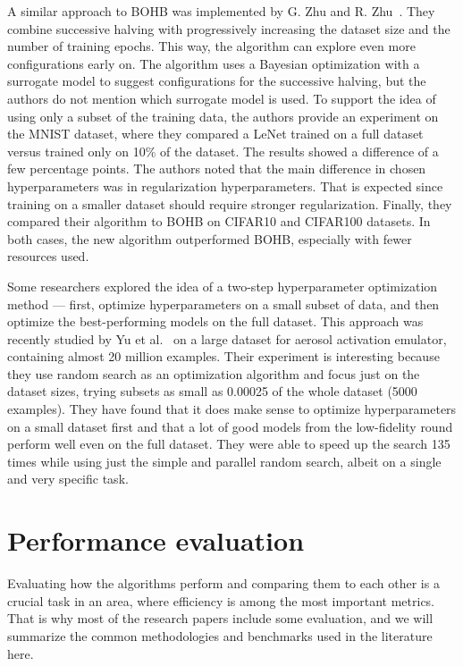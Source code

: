 A similar approach to BOHB was implemented by G. Zhu and R. Zhu~\cite{zhu2020accelerating}. They combine successive halving with progressively increasing the dataset size and the number of training epochs. This way, the algorithm can explore even more configurations early on. The algorithm uses a Bayesian optimization with a surrogate model to suggest configurations for the successive halving, but the authors do not mention which surrogate model is used. To support the idea of using only a subset of the training data, the authors provide an experiment on the MNIST dataset, where they compared a LeNet trained on a full dataset versus trained only on 10\% of the dataset. The results showed a difference of a few percentage points. The authors noted that the main difference in chosen hyperparameters was in regularization hyperparameters. That is expected since training on a smaller dataset should require stronger regularization. Finally, they compared their algorithm to BOHB on CIFAR10 and CIFAR100 datasets. In both cases, the new algorithm outperformed BOHB, especially with fewer resources used.



Some researchers explored the idea of a two-step hyperparameter optimization method --- first, optimize hyperparameters on a small subset of data, and then optimize the best-performing models on the full dataset. This approach was recently studied by Yu et al.~\cite{yu2024two} on a large dataset for aerosol activation emulator, containing almost 20 million examples. Their experiment is interesting because they use random search as an optimization algorithm and focus just on the dataset sizes, trying subsets as small as 0.00025 of the whole dataset (5000 examples). They have found that it does make sense to optimize hyperparameters on a small dataset first and that a lot of good models from the low-fidelity round perform well even on the full dataset. They were able to speed up the search 135 times while using just the simple and parallel random search, albeit on a single and very specific task.

\section{Performance evaluation}
Evaluating how the algorithms perform and comparing them to each other is a crucial task in an area, where efficiency is among the most important metrics. That is why most of the research papers include some evaluation, and we will summarize the common methodologies and benchmarks used in the literature here.

